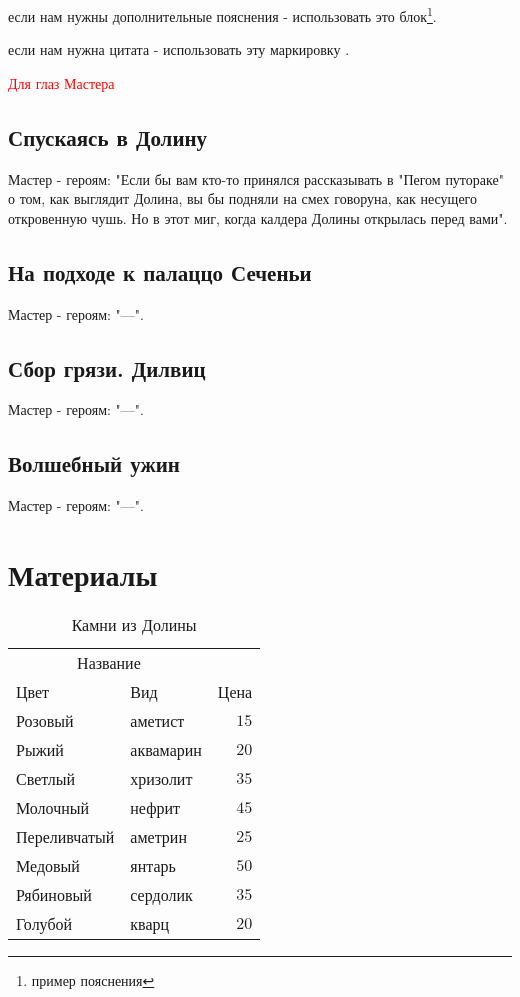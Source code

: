 \documentclass[twoside,twocolumn]{article}
\begin{document}
если нам нужны дополнительные пояснения - использовать это блок\footnote{пример пояснения}.

если нам нужна цитата - использовать эту маркировку \cite{Core:2016}.

\textcolor{red}{Для глаз Мастера}

\subsection{Спускаясь в Долину}
Мастер - героям:
"Если бы вам кто-то принялся рассказывать в "Пегом путораке" о том, как выглядит Долина, вы бы подняли на смех говоруна, как несущего откровенную чушь. Но в этот миг, когда калдера Долины открылась перед вами".

\subsection{На подходе к палаццо Сеченьи}
Мастер - героям:
"---".

\subsection{Сбор грязи. Дилвиц}
Мастер - героям:
"---".

\subsection{Волшебный ужин}
Мастер - героям:
"---".

\section{Материалы}
\begin{table}
\caption{Камни из Долины}
\centering
\begin{tabular}{llr}
\toprule
\multicolumn{2}{c}{Название} \\
\cmidrule(r){1-2}
Цвет & Вид & Цена \\
\midrule
Розовый & аметист & $15$ \\
Рыжий & аквамарин & $20$ \\
Светлый & хризолит & $35$ \\
Молочный & нефрит & $45$ \\
Переливчатый & аметрин & $25$ \\
Медовый & янтарь & $50$ \\
Рябиновый & сердолик & $35$ \\
Голубой & кварц & $20$ \\
\bottomrule
\end{tabular}
\end{table}
\end{document}
